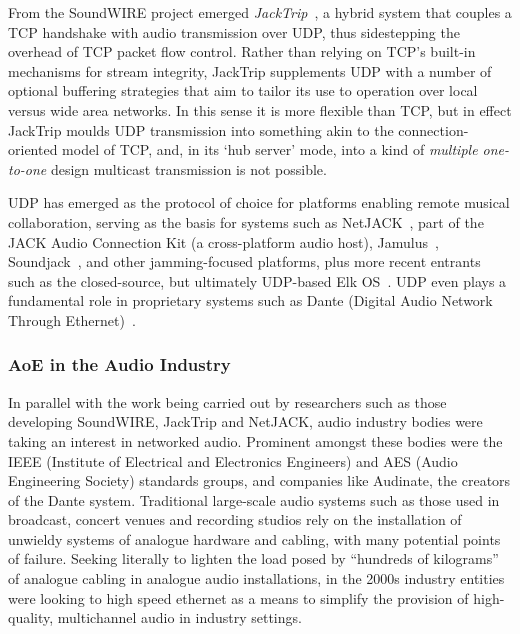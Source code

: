 From the SoundWIRE project emerged
\textit{JackTrip}~\citep{caceres_jacktrip_2010,caceras_jacktripsoundwire_2010},
a hybrid system that couples a TCP handshake with audio transmission over UDP,
thus sidestepping the overhead of TCP packet flow control.
Rather than relying on TCP's built-in mechanisms for stream integrity, JackTrip
supplements UDP with a number of optional buffering strategies that aim to
tailor its use to operation over local versus wide area networks.
In this sense it is more flexible than TCP, but in effect JackTrip moulds UDP
transmission into something akin to the connection-oriented model of TCP, and,
in its `hub server' mode, into a kind of \textit{multiple one-to-one} design
\textemdash{} multicast transmission is not possible.

UDP has emerged as the protocol of choice for platforms enabling remote musical
collaboration, serving as the basis for systems such as
NetJACK~\citep{carot_netjack_2009}, part of the JACK Audio Connection Kit (a
cross-platform audio host), Jamulus~\citep{fischer_case_2015},
Soundjack~\citep{renaud_networked_2012}, and other jamming-focused platforms,
plus more recent entrants such as the closed-source, but ultimately UDP-based
Elk OS~\citep{turchet_elk_2021}.
UDP even plays a fundamental role in proprietary systems such as Dante (Digital
Audio Network Through Ethernet)~\citep{noauthor_what_nodate}.

\subsubsection{AoE in the Audio Industry}

In parallel with the work being carried out by researchers such as those
developing SoundWIRE, JackTrip and NetJACK, audio industry bodies were taking
an interest in networked audio.
Prominent amongst these bodies were the IEEE (Institute of Electrical and
Electronics Engineers) and AES (Audio Engineering Society) standards groups,
and companies like Audinate, the creators of the Dante system.
Traditional large-scale audio systems such as those used in broadcast, concert
venues and recording studios rely on the installation of unwieldy systems of
analogue hardware and cabling, with many potential points of failure.
Seeking literally to lighten the load posed by ``hundreds of
kilograms''~\citep{bakker_introduction_2014} of analogue cabling in analogue
audio installations, in the 2000s industry entities were looking to high speed
ethernet as a means to simplify the provision of high-quality, multichannel
audio in industry settings.


